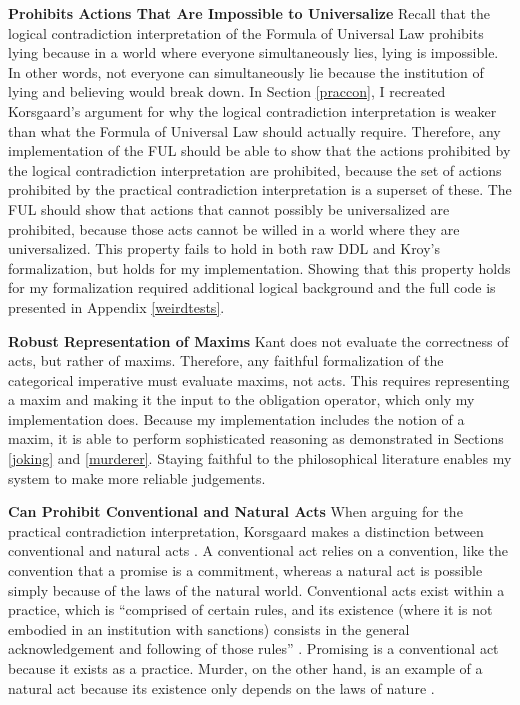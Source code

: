 \begin{isabellebody}
\begin{isamarkuptext}
\noindent \textbf{Prohibits Actions That Are Impossible to Universalize} Recall that 
the logical contradiction interpretation of the Formula of Universal Law prohibits lying because in a world 
where everyone simultaneously lies, lying is impossible. In other words, not everyone can simultaneously
lie because the institution of lying and believing would break down. In Section \ref{praccon}, 
I recreated Korsgaard's argument for why the logical contradiction interpretation is weaker than what the
Formula of Universal Law should actually require. Therefore, any implementation of the FUL should be 
able to show that the actions prohibited by the logical contradiction interpretation are prohibited, 
because the set of actions prohibited by the practical contradiction interpretation is a superset of these.
The FUL should show that actions that cannot possibly be universalized are prohibited, because those acts cannot be willed in 
a world where they are universalized. This property fails to hold in both raw DDL
and Kroy's formalization, but holds for my implementation. Showing that this property holds
for my formalization required additional logical background and the full code is presented in Appendix \ref{weirdtests}.%
\end{isamarkuptext}\isamarkuptrue%
%
\begin{isamarkuptext}%
\noindent \textbf{Robust Representation of Maxims} Kant does not evaluate the correctness of acts, but rather of maxims. Therefore, any 
faithful formalization of the categorical imperative must evaluate maxims, not acts. This requires 
representing a maxim and making it the input to the obligation operator, which only my implementation 
does. Because my implementation includes the notion of a maxim, it is able to perform sophisticated 
reasoning as demonstrated in Sections \ref{joking} and \ref{murderer}. Staying faithful to the philosophical 
literature enables my system to make more reliable judgements.

\medskip%
\end{isamarkuptext}\isamarkuptrue%
%
\begin{isamarkuptext}%
\noindent \textbf{Can Prohibit Conventional and Natural Acts} When arguing for the practical contradiction interpretation,
Korsgaard makes a distinction between conventional and natural acts \citep{KorsgaardFUL}. 
A conventional act relies on a convention, like the 
convention that a promise is a commitment, whereas a natural act is possible simply because of the laws 
of the natural world. Conventional acts exist within a practice, which is ``comprised of certain rules, 
and its existence (where it is not embodied in an institution with sanctions) consists in the general 
acknowledgement and following of those rules'' \cite[10]{KorsgaardFUL}. Promising is a conventional act 
because it exists as a practice. Murder, on the other hand, is an example of a natural act because 
its existence only depends on the laws of nature \cite[11]{KorsgaardFUL}.


\end{isamarkuptext}
\end{isabellebody}
